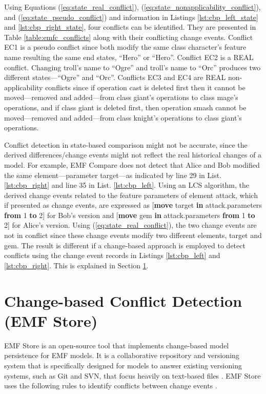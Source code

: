 Using Equations (\ref{eq:state_real_conflict}), (\ref{eq:state_nonapplicability_conflict}), and (\ref{eq:state_pseudo_conflict}) and information in Listings \ref{lst:cbp_left_state} and \ref{lst:cbp_right_state}, four conflicts can be identified. They are presented in Table \ref{table:emfc_conflicts} along with their conflicting change events. Conflict \textsf{EC1} is a \textsf{pseudo} conflict since both modify the same class \textsf{character}’s feature \textsf{name} resulting the same end states, “Hero” or “Hero”. Conflict \textsf{EC2} is a \textsf{REAL} conflict. Changing \textsf{troll}’s \textsf{name} to “Ogre” and \textsf{troll}’s \textsf{name} to “Orc” produces two different states—“Ogre” and “Orc”. Conflicts \textsf{EC3} and \textsf{EC4} are \textsf{REAL} non-applicability conflicts since if operation \textsf{cast} is deleted first then it cannot be moved—removed and added—from class \textsf{giant}’s \textsf{operations} to class \textsf{mage}’s \textsf{operations}, and if class \textsf{giant} is deleted first, then operation \textsf{smash} cannot be moved—removed and added—from class \textsf{knight}’s \textsf{operations} to class \textsf{giant}’s \textsf{operations}.

Conflict detection in state-based comparison might not be accurate, since the derived differences/change events might not reflect the real historical changes of a model. For example, EMF Compare \cite{emfcompare2018developer} does not detect that Alice and Bob modified the same element—parameter \textsf{target}—as indicated by line 29 in List. \ref{lst:cbp_right} and line 35 in List. \ref{lst:cbp_left}. Using an LCS algorithm, the derived change events related to the feature \textsf{parameters} of element \textsf{attack}, which if presented as change events, are expressed as [\textsf{\small \textbf{move} target \textbf{in} attack.parameters \textbf{from} 1 \textbf{to} 2}] for Bob’s version and [\textsf{\small \textbf{move} gem \textbf{in} attack.parameters \textbf{from} 1 \textbf{to} 2}] for Alice’s version. Using (\ref{eq:state_real_conflict}), the two change events are not in conflict since these change events modify two different elements, \textsf{target} and \textsf{gem}. The result is different if a change-based approach is employed to detect conflicts using the change event records in Listings \ref{lst:cbp_left} and \ref{lst:cbp_right}. This is explained in Section \ref{sec:emfstore_conflict_detection}.

\section{Change-based Conflict Detection (EMF Store)}
\label{sec:emfstore_conflict_detection}
EMF Store \cite{koegel2010emfstore} is an open-source tool that implements change-based model persistence for EMF models. It is a collaborative repository and versioning system that is specifically designed for models to answer existing versioning systems, such as Git and SVN, that focus heavily on text-based files \cite{emfstore2019what}. EMF Store uses the following rules to identify conflicts between change events \cite{koegel2010operation}.

